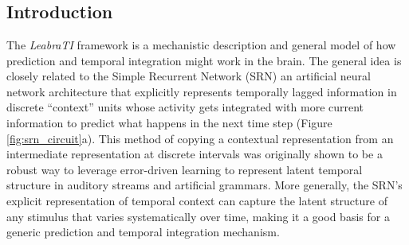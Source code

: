 \documentclass[dwyatte_dissertation.tex]{subfiles}
\begin{document}
\chapter{}
\label{chap:leabrati}

%
%
%



\section{Introduction}
The \textit{LeabraTI} framework is a mechanistic description and general model of how prediction and temporal integration might work in the brain. The general idea is closely related to the Simple Recurrent Network (SRN) \cite{Elman90,Servan-SchreiberCleeremansMcClelland91}  an artificial neural network architecture that explicitly represents temporally lagged information in discrete ``context'' units whose activity gets integrated with more current information to predict what happens in the next time step (Figure \ref{fig:srn_circuit}a). This method of copying a contextual representation from an intermediate representation at discrete intervals was originally shown to be a robust way to leverage error-driven learning to represent latent temporal structure in auditory streams and artificial grammars. More generally, the SRN's explicit representation of temporal context can capture the latent structure of any stimulus that varies systematically over time, making it a good basis for a generic prediction and temporal integration mechanism.
\end{document}
